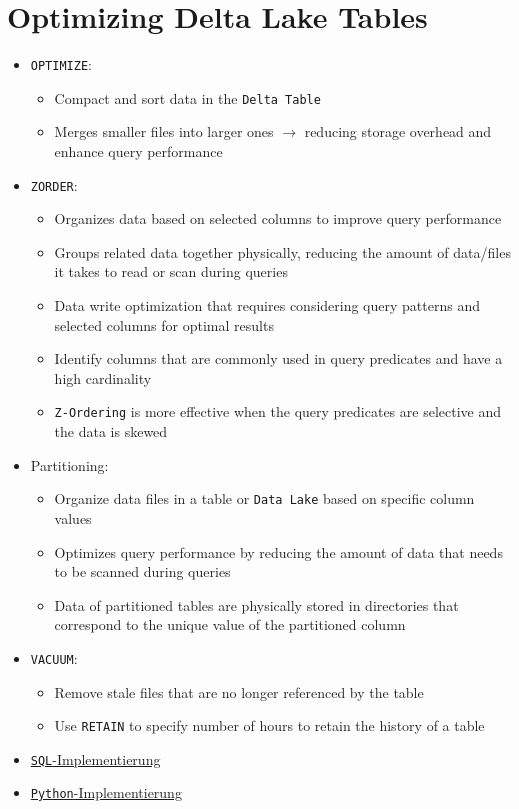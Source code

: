 \documentclass[11pt]{scrartcl}
\begin{document}
\newpage
\section{Optimizing Delta Lake Tables}
\begin{itemize}
	\item \texttt{OPTIMIZE}:
	\begin{itemize}
		\item Compact and sort data in the \texttt{Delta Table}
		\item Merges smaller files into larger ones $\to$ reducing storage overhead and enhance query performance
	\end{itemize}
	\item \texttt{ZORDER}:
	\begin{itemize}
		\item Organizes data based on selected columns to improve query performance
		\item Groups related data together physically, reducing the amount of data/files it takes to read or scan during queries
		\item Data write optimization that requires considering query patterns and selected columns for optimal results 
		\item Identify columns that are commonly used in query predicates and have a high cardinality
		\item \texttt{Z-Ordering} is more effective when the query predicates are selective and the data is skewed
	\end{itemize}
	\item Partitioning:
	\begin{itemize}
		\item Organize data files in a table or \texttt{Data Lake} based on specific column values
		\item Optimizes query performance by reducing the amount of data that needs to be scanned during queries
		\item Data of partitioned tables are physically stored in directories that correspond to the unique value of the partitioned column
	\end{itemize}
	\item \texttt{VACUUM}:
	\begin{itemize}
		\item Remove stale files that are no longer referenced by the table
		\item Use \texttt{RETAIN} to specify number of hours to retain the history of a table
	\end{itemize}
	\item \hyperref[optimize_sql]{\texttt{SQL}-Implementierung}
	\item \hyperref[optimize_python]{\texttt{Python}-Implementierung}
\end{itemize}
\end{document}
